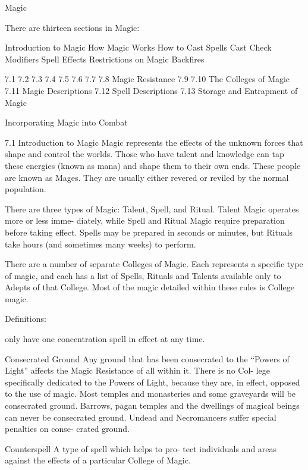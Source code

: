 \begin{Chapter}{Magic}

There are thirteen sections in Magic: 

Introduction to Magic 
How Magic Works 
How to Cast Spells 
Cast Check Modifiers 
Spell Effects 
Restrictions on Magic 
Backfires 

7.1 
7.2 
7.3 
7.4 
7.5 
7.6 
7.7 
7.8  Magic Resistance 
7.9 
7.10  The Colleges of Magic 
7.11  Magic Descriptions 
7.12  Spell Descriptions 
7.13  Storage and Entrapment of Magic 

Incorporating Magic into Combat 

7.1 Introduction to Magic 
Magic represents the effects of the unknown forces 
that shape and control the worlds. Those who have 
talent  and  knowledge  can  tap  these  energies 
(known  as  mana)  and  shape  them  to  their  own 
ends. These people are known as Mages. They are 
usually  either  revered  or  reviled  by  the  normal 
population. 

There  are  three  types  of  Magic:  Talent,  Spell,  and 
Ritual.  Talent  Magic  operates  more  or  less  imme-
diately,  while  Spell  and  Ritual  Magic  require 
preparation  before  taking  effect.  Spells  may  be 
prepared  in  seconds  or  minutes,  but  Rituals  take 
hours (and sometimes many weeks) to perform. 

There are a number of separate Colleges of Magic. 
Each represents a specific type of magic, and each 
has  a  list  of  Spells,  Rituals  and  Talents  available 
only to  Adepts of that College. Most of the magic 
detailed within these rules is College magic. 

Definitions: 

only  have  one  concentration  spell  in  effect  at  any 
time. 

Consecrated  Ground  Any  ground  that  has  been 
consecrated  to  the  “Powers  of  Light”  affects  the 
Magic Resistance of all within it. There is no Col-
lege  specifically  dedicated  to the  Powers  of  Light, 
because  they  are,  in  effect,  opposed  to  the  use  of 
magic.  Most  temples  and  monasteries  and  some 
graveyards  will  be  consecrated  ground.  Barrows, 
pagan temples and the dwellings of magical beings 
can  never  be  consecrated  ground.  Undead  and 
Necromancers  suffer  special  penalties  on  conse-
crated ground. 

Counterspell  A  type  of  spell  which  helps  to  pro-
tect  individuals  and  areas  against  the  effects  of  a 
particular College of Magic. 


\end{Chapter}
